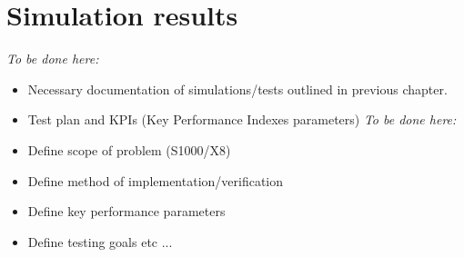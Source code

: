 \chapter{Simulation results}\label{ch:Simulations}
\emph{To be done here:}
    \begin{itemize}
        \item  Necessary  documentation of simulations/tests outlined in previous chapter. 
        \item Test plan and KPIs (Key Performance Indexes parameters)
        \emph{To be done here:}
        \item Define scope of problem (S1000/X8)
        \item Define method of implementation/verification
        \item Define key performance parameters 
        \item Define testing goals etc ...
    \end{itemize}
    